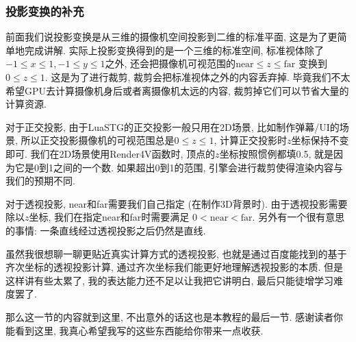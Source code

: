 \subsubsection{投影变换的补充}

前面我们说投影变换是从三维的摄像机空间投影到二维的标准平面,
这是为了更简单地完成讲解. 实际上投影变换得到的是一个三维的标准空间,
标准视体除了$-1\le x\le1, -1\le y\le1$之外,
还会把摄像机可视范围的$\text{near}\le z\le\text{far}$
变换到$0\le z\le1$. 这是为了进行裁剪,
裁剪会把标准视体之外的内容丢弃掉.
毕竟我们不太希望GPU去计算摄像机身后或者离摄像机太远的内容,
裁剪掉它们可以节省大量的计算资源.

对于正交投影, 由于LuaSTG的正交投影一般只用在2D场景,
比如制作弹幕/UI的场景,
所以正交投影摄像机的可视范围总是$0\le z\le1$,
计算正交投影时$z$坐标保持不变即可.
我们在2D场景使用Render4V函数时,
顶点的$z$坐标按照惯例都填0.5, 就是因为它是0到1之间的一个数.
如果超出0到1的范围, 引擎会进行裁剪使得渲染内容与我们的预期不同.

对于透视投影, near和far需要我们自己指定
(在制作3D背景时). 由于透视投影需要除以$z$坐标,
我们在指定near和far时需要满足
$0 < \text{near} < \text{far}$.
另外有一个很有意思的事情: 一条直线经过透视投影之后仍然是直线.

虽然我很想聊一聊更贴近真实计算方式的透视投影,
也就是通过百度能找到的基于齐次坐标的透视投影计算,
通过齐次坐标我们能更好地理解透视投影的本质.
但是这样讲有些太累了, 我的表达能力还不足以让我把它讲明白,
最后只能徒增学习难度罢了.

那么这一节的内容就到这里,
不出意外的话这也是本教程的最后一节.
感谢读者你能看到这里, 我真心希望我写的这些东西能给你带来一点收获.
